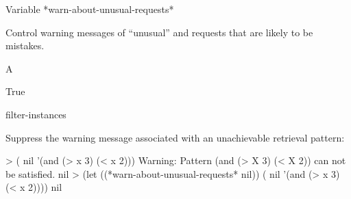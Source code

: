 \documentclass[10pt,twoside,english,pdftex]{article}
\begin{document}
\begin{functiondoc}{Variable}%
{*warn-about-unusual-requests*}{}%

\fnsyntax

\fnpurpose Control warning messages of ``unusual''
\textbf{} and \textbf{}
requests that are likely to be mistakes.

\fnpackage {}

\fnmodule {}

\fnvaluetype A 

\fninitialvalue True

\begin{alsos}{filter-instances}
\end{alsos}

\fnexample
Suppress the warning message associated with an unachievable retrieval pattern:
%
\W\supp
\begin{example}
> ( nil '(and (> x 3) (< x 2)))
Warning: Pattern (and (> X 3) (< X 2)) can not be satisfied.
nil
> (let ((*warn-about-unusual-requests* nil))
    ( nil '(and (> x 3) (< x 2))))
nil
\end{example}

\end{functiondoc}

\end{document}

